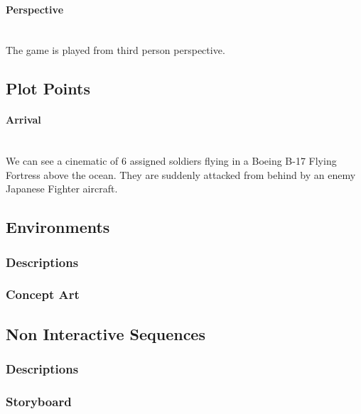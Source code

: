             \paragraph{Perspective}\mbox{}\\
                The game is played from third person perspective.
    \subsection{Plot Points}
        \paragraph{Arrival}\mbox{}\\
            We can see a cinematic of 6 assigned soldiers flying in a Boeing 
            B-17 Flying Fortress above the ocean. They are suddenly attacked 
            from behind by an enemy Japanese Fighter aircraft.
    \subsection{Environments}
        \subsubsection{Descriptions}
        \subsubsection{Concept Art}
    \subsection{Non Interactive Sequences}
        \subsubsection{Descriptions}
        \subsubsection{Storyboard}